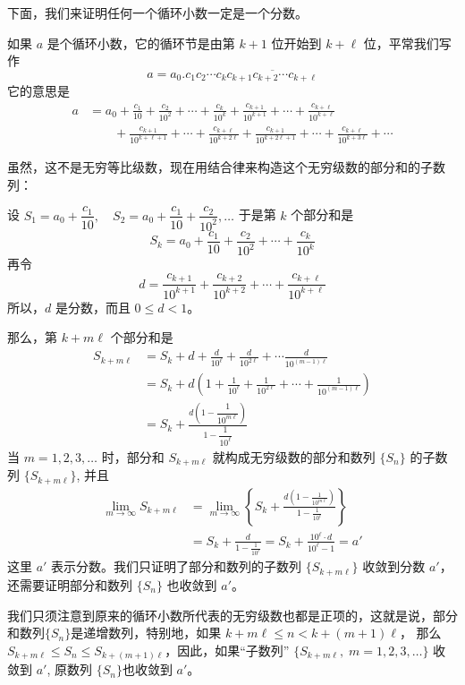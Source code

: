 下面，我们来证明任何一个循环小数一定是一个分数。

如果 $a$ 是个循环小数，它的循环节是由第 $k+1$ 位开始到 $k+\ell$ 位，平常我们写作
\[a=a_0.c_1c_2\cdots c_k\overline{c_{k+1}c_{k+2}\cdots c_{k+\ell}}\]
它的意思是
\[\begin{split}
    a&=a_0+\frac{c_1}{10}+\frac{c_2}{10^2}+\cdots +\frac{c_k}{10^k}+\frac{c_{k+1}}{10^{k+1}}+\cdots+\frac{c_{k+\ell}}{10^{k+\ell}}\\
&\qquad +\frac{c_{k+1}}{10^{k+\ell+1}}+\cdots+\frac{c_{k+\ell}}{10^{k+2\ell}}+\frac{c_{k+1}}{10^{k+2\ell+1}}+\cdots+\frac{c_{k+\ell}}{10^{k+3\ell}}+\cdots
\end{split}\]

虽然，这不是无穷等比级数，现在用结合律来构造这个无穷级数的部分和的子数列：

设 $S_1=a_0+\dfrac{c_1}{10},\quad S_2=a_0+\dfrac{c_1}{10}+\dfrac{c_2}{10^2},\ldots$ 于是第 $k$ 个部分和是
\[S_k=a_0+\frac{c_1}{10}+\frac{c_2}{10^2}+\cdots+\frac{c_k}{10^k}\]
再令
\[d=\frac{c_{k+1}}{10^{k+1}}+\frac{c_{k+2}}{10^{k+2}}+\cdots +\frac{c_{k+\ell}}{10^{k+\ell}}\]
所以，$d$ 是分数，而且 $0\leqslant d<1$。

那么，第 $k+m\ell$ 个部分和是
\[\begin{split}
    S_{k+m\ell}&=S_k+d+\frac{d}{10^{\ell}}+\frac{d}{10^{2\ell}}+\cdots \frac{d}{10^{(m-1)\ell}}\\
    &=S_k+d\left(1+\frac{1}{10^{\ell}}+\frac{1}{10^{2\ell}}+\cdots +\frac{1}{10^{(m-1)\ell}}\right)\\
    &=S_k+\frac{d\left(1-\dfrac{1}{10^{m\ell}}\right)}{1-\dfrac{1}{10^{\ell}}}
\end{split}\]
当 $m=1,2,3,\ldots$ 时，部分和 $S_{k+m\ell}$ 就构成无穷级数的部分和数列 $\{S_n\}$ 的子数列 $\{S_{k+m\ell}\}$, 并且
\[\begin{split}
    \lim_{m\to\infty}S_{k+m\ell}&= \lim_{m\to\infty}\left\{S_k+\frac{d\left(1-\frac{1}{10^{m\ell}}\right)}{1-\frac{1}{10^{\ell}}}\right\}\\
    &=S_k+\frac{d}{1-\frac{1}{10^{\ell}}}=S_k+\frac{10^{\ell}\cdot d}{10^{\ell}-1}=a'
\end{split}\]
这里 $a'$ 表示分数。我们只证明了部分和数列的子数列 $\{S_{k+m\ell}\}$ 收敛到分数
$a'$，还需要证明部分和数列 $\{S_n\}$ 也收敛到 $a'$。

我们只须注意到原来的循环小数所代表的无穷级数也都是正项的，这就是说，部分和数列$\{S_n\}$是递增数列，特别地，如果 $k+m\ell\leqslant n<k+(m+1)\ell$，
那么 $S_{k+m\ell}\leqslant S_n\leqslant S_{k+(m+1)\ell}$，因此，如果“子数列” $\{S_{k+m\ell},\; m=1,2,3,\ldots\}$ 收敛到 $a'$, 原数列 $\{S_n\}$也收敛到 $a'$。

